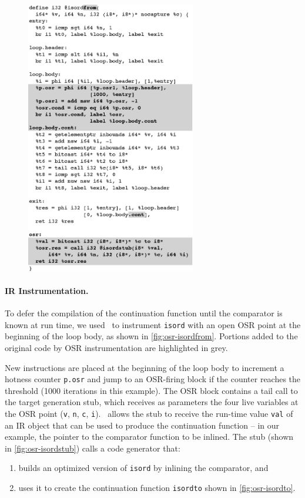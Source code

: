 \ifdefined\noauthorea
\begin{figure}[!ht]
\begin{center}
\includegraphics[width=0.66\textwidth]{figures/osr-isordfrom/osr-isordfrom.eps}
\caption{\protect}
\end{center}
\end{figure}
\fi

\paragraph*{IR Instrumentation.}
To defer the compilation of the continuation function until the comparator is known at run time, we used \osrkit\ to instrument {\tt isord} with an open OSR point at the beginning of the loop body, as shown in \myfigure\ref{fig:osr-isordfrom}. Portions added to the original code by OSR instrumentation are highlighted in grey.

New instructions are placed at the beginning of the loop body to increment a hotness counter {\tt p.osr} and jump to an OSR-firing block if the counter reaches the threshold (1000 iterations in this example). The OSR block contains a tail call to the target generation stub, which receives as parameters the four live variables at the OSR point ({\tt v}, {\tt n}, {\tt c}, {\tt i}). \osrkit\ allows the stub to receive the run-time value {\tt val} of an IR object that can be used to produce the continuation function -- in our example, the pointer to the comparator function to be inlined. The stub (shown in \myfigure\ref{fig:osr-isordstub}) calls a code generator that:
\begin{enumerate}[parsep=0pt,itemsep=3pt]
 \item builds an optimized version of {\tt isord} by inlining the comparator, and
 \item uses it to create the continuation function {\tt isordto} shown in \myfigure\ref{fig:osr-isordto}.
\end{enumerate}

